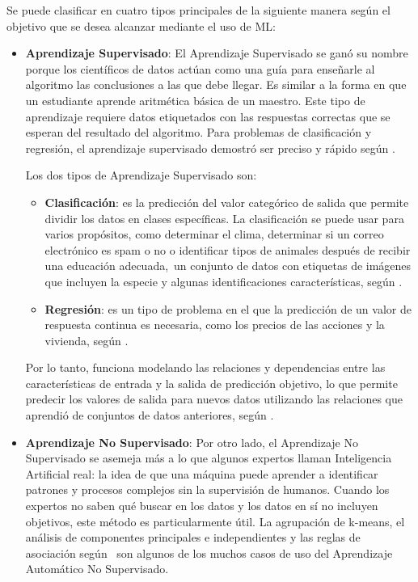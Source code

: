 Se puede clasificar en cuatro tipos principales de la siguiente manera según el objetivo que se desea alcanzar mediante el uso de ML:
\begin{itemize}
	\item \textbf{Aprendizaje Supervisado}: El Aprendizaje Supervisado se ganó su nombre porque los científicos de datos actúan como una guía para enseñarle al algoritmo las conclusiones a las que debe llegar. Es similar a la forma en que un estudiante aprende aritmética básica de un maestro. Este tipo de aprendizaje requiere datos etiquetados con las respuestas correctas que se esperan del resultado del algoritmo. Para problemas de clasificación y regresión, el aprendizaje supervisado demostró ser preciso y rápido según \parencite{bk_zambrano2018supnosup}.
	
	Los dos tipos de Aprendizaje Supervisado son:

	\begin{itemize}
		\item \textbf{Clasificación}: es la predicción del valor categórico de salida que permite dividir los datos en clases específicas. La clasificación se puede usar para varios propósitos, como determinar el clima, determinar si un correo electrónico es spam o no o identificar tipos de animales después de recibir una educación adecuada, un conjunto de datos con etiquetas de imágenes que incluyen la especie y algunas identificaciones características, según \parencite{bk_zambrano2018supnosup}.
		\item \textbf{Regresión}: es un tipo de problema en el que la predicción de un valor de respuesta continua es necesaria, como los precios de las acciones y la vivienda, según \parencite{bk_zambrano2018supnosup}.
	\end{itemize}

	Por lo tanto, funciona modelando las relaciones y dependencias entre las características de entrada y la salida de predicción objetivo, lo que permite predecir los valores de salida para nuevos datos utilizando las relaciones que aprendió de conjuntos de datos anteriores, según \parencite{bk_alpaydin2014ml}.

	\item \textbf{Aprendizaje No Supervisado}: Por otro lado, el Aprendizaje No Supervisado se asemeja más a lo que algunos expertos llaman Inteligencia Artificial real: la idea de que una máquina puede aprender a identificar patrones y procesos complejos sin la supervisión de humanos. Cuando los expertos no saben qué buscar en los datos y los datos en sí no incluyen objetivos, este método es particularmente útil. La agrupación de k-means, el análisis de componentes principales e independientes y las reglas de asociación según \parencite{bk_zambrano2018supnosup} son algunos de los muchos casos de uso del Aprendizaje Automático No Supervisado.
	

\end{itemize}
